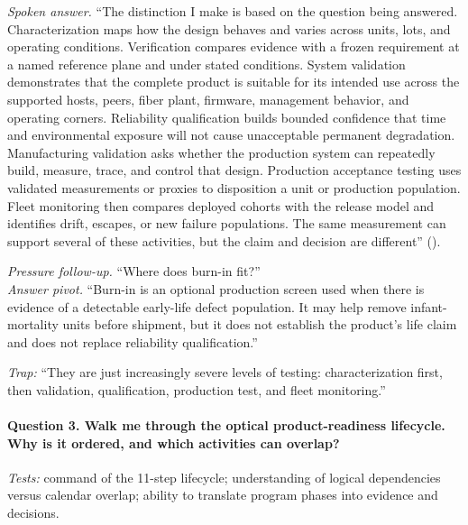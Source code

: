 \textit{Spoken answer.}
``The distinction I make is based on the question being answered.
Characterization maps how the design behaves and varies across units, lots, and
operating conditions. Verification compares evidence with a frozen requirement
at a named reference plane and under stated conditions. System validation
demonstrates that the complete product is suitable for its intended use across
the supported hosts, peers, fiber plant, firmware, management behavior, and
operating corners. Reliability qualification builds bounded confidence that time
and environmental exposure will not cause unacceptable permanent degradation.
Manufacturing validation asks whether the production system can repeatedly
build, measure, trace, and control that design. Production acceptance testing
uses validated measurements or proxies to disposition a unit or production
population. Fleet monitoring then compares deployed cohorts with the release
model and identifies drift, escapes, or new failure populations. The same
measurement can support several of these activities, but the claim and decision
are different'' ().

\textit{Pressure follow-up.} ``Where does burn-in fit?''\\
\textit{Answer pivot.} ``Burn-in is an optional production screen used when
there is evidence of a detectable early-life defect population. It may help
remove infant-mortality units before shipment, but it does not establish the
product's life claim and does not replace reliability qualification.''

\textit{Trap:} ``They are just increasingly severe levels of testing:
characterization first, then validation, qualification, production test, and
fleet monitoring.''

\paragraph{Question 3. Walk me through the optical product-readiness lifecycle.
Why is it ordered, and which activities can overlap?}
\textit{Tests:} command of the 11-step lifecycle; understanding of logical
dependencies versus calendar overlap; ability to translate program phases into
evidence and decisions.

